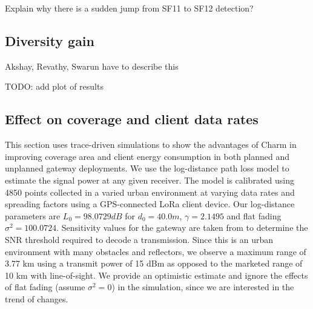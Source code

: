 Explain why there is a sudden jump from SF11 to SF12 detection?

\subsection{Diversity gain}
\label{sec:diversity-gain-eval}

{\color{blue} Akshay, Revathy, Swarun have to describe this

TODO: add plot of results}

\subsection{Effect on coverage and client data rates}
\label{sec:coverage-data-rate-improvement}

This section uses trace-driven simulations to show the advantages of Charm in improving coverage area and client energy consumption in both planned and unplanned gateway deployments. We use the log-distance path loss model to estimate the signal power at any given receiver. The model is calibrated using 4850 points collected in a varied urban environment at varying data rates and spreading factors using a GPS-connected LoRa client device. Our log-distance parameters are $L_0  = 98.0729 dB$ for $d_0 = 40.0 m$, $\gamma = 2.1495$ and flat fading $\sigma^2 = 100.0724$. Sensitivity values for the gateway are taken from \cite{Bor2016} to determine the SNR threshold required to decode a transmission. Since this is an urban environment with many obstacles and reflectors, we observe a maximum range of 3.77 km using a transmit power of 15 dBm as opposed to the marketed range of 10 km with line-of-sight. We provide an optimistic estimate and ignore the effects of flat fading (assume $\sigma^2 = 0$) in the simulation, since we are interested in the trend of changes.

